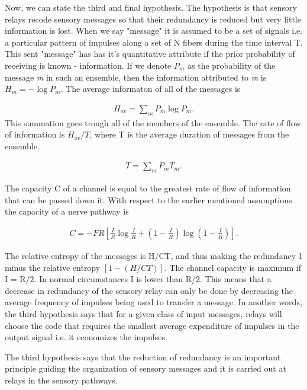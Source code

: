 \documentclass[twoside]{article}
\begin{document}
\begin{multicols}{2}
Now, we can state the third and final hypothesis. The hypothesis is that sensory relays recode sensory messages so that their redundancy is reduced but very little information is lost. When we say "message" it is assumed to be a set of signals i.e. a particular pattern of impulses along a set of N fibers during the time interval T. This sent "message" has has it's quantitative attribute if the prior probability of receiving is known - information. If we denote $P_m$ as the probability of the message \textit{m} in such an ensemble, then the information attributed to \textit{m} is $H_{m}=-\log P_m $. The average informaton of all of the messages is 

\begin{align} \label{eq:1}
H_{av}= \sum_m P_m \log P_m.
\end{align}
This summation goes trough all of the members of the ensemble. The rate of flow of information is $H_{av}/T$, where T is the average duration of messages from the ensemble.

\begin{align} \label{eq:2}
T = \sum_m P_m T_m.
\end{align}

The capacity C of a channel is equal to the greatest rate of flow of information that can be passed down it. With respect to the earlier mentioned assumptions the capacity of a nerve pathway is

\begin{align} \label{eq:3}
C = - FR \left[\frac{I}{R} \log \frac{I}{R} +\left(1-\frac{I}{R} \right) \log  \left(1-\frac{I}{R} \right) \right].
\end{align}

The relative entropy of the messages is H/CT, and thus making the redundancy 1 minus the relative entropy $[1-(H/CT)]$.
The channel capacity is maximum if I = R/2. In normal circumstances I is lower than R/2. This means that a decrease in redundancy of the sensory relay can only be done by decreasing the average frequency of impulses being used to transfer a message. 
In another words, the third hypothesis says that for a given class of input messages, relays will choose the code that requires the smallest average expenditure of impulses in the output signal i.e. it economizes the impulses.

The third hypothesis says that the reduction of redundancy is an important principle guiding the organization of sensory messages and it is carried out at relays in the sensory pathways.


\end{multicols}
\end{document}
